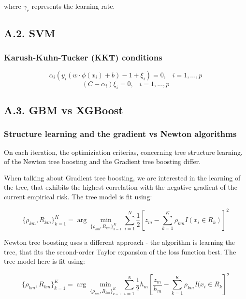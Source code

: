 \documentclass[12pt,]{article}
\begin{document}
where \(\gamma_r\) represents the learning rate.

\hypertarget{a.2.-svm}{%
\subsection{A.2. SVM}\label{a.2.-svm}}

\hypertarget{karush-kuhn-tucker-kkt-conditions}{%
\subsubsection{Karush-Kuhn-Tucker (KKT)
conditions}\label{karush-kuhn-tucker-kkt-conditions}}

\[\alpha_i(y_i(w\cdot\phi(x_i)+b)-1+\xi_i)=0,\;\;\;i=1,...,p\]
\[(C-\alpha_i)\xi_i=0,\;\;\;i=1,...,p\]

\hypertarget{a.3.-gbm-vs-xgboost}{%
\subsection{A.3. GBM vs XGBoost}\label{a.3.-gbm-vs-xgboost}}

\hypertarget{structure-learning-and-the-gradient-vs-newton-algorithms}{%
\subsubsection{Structure learning and the gradient vs Newton
algorithms}\label{structure-learning-and-the-gradient-vs-newton-algorithms}}

On each iteration, the optimiziation criterias, concerning tree
structure learning, of the Newton tree boosting and the Gradient tree
boosting differ.

When talking about Gradient tree boosting, we are interested in the
learning of the tree, that exhibits the highest correlation with the
negative gradient of the current empirical risk. The tree model is fit
using:

\[\{\rho_{km}, R_{km}\}_{k=1}^{K}=\arg\min_{\{\rho_{km}, R_{km}\}_{k=1}^{K}}\sum_{i=1}^{N}\frac{1}{2}[z_{m}-\sum_{k=1}^{K}\rho_{km}I(x_{i}\in R_k)]^2\]

Newton tree boosting uses a different approach - the algorithm is
learning the tree, that fits the second-order Taylor expansion of the
loss function best. The tree model here is fit using:

\[\{\rho_{km}, R_{km}\}_{k=1}^{K}=\arg\min_{\{\rho_{km}, R_{km}\}_{k=1}^{K}}\sum_{i=1}^{N}\frac{1}{2}h_m[\frac{z_m}{h_m}-\sum_{k=1}^{K}\rho_{km}I(x_{i}\in R_k]^2\]
\end{document}
